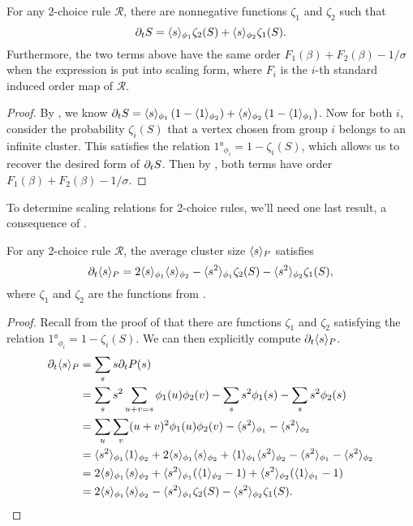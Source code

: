 \documentclass[twoside,10pt]{article}
\begin{document}
\begin{thrm}
	\label{2c-same-order}
	For any 2-choice rule $\mathcal{R}$, there are nonnegative functions $\zeta_1$ and $\zeta_2$ such that
	\[
		\partial_{t}{S} = \langle s \rangle_{\phi_1}\zeta_2(S) + \langle s \rangle_{\phi_2}\zeta_1(S).
	\] 
	Furthermore, the two terms above have the same order $F_1(\beta) + F_2(\beta) - 1/\sigma$ when the expression is put into scaling form, where $F_{i}$ is the $i$-th standard induced order map of $\mathcal{R}$.
\end{thrm}
\begin{proof}
	By , we know $\partial_{t}{S} = \langle s \rangle_{\phi_1}\left( 1-\langle 1 \rangle_{\phi_2} \right) + \langle s \rangle_{\phi_2}\left( 1-\langle 1 \rangle_{\phi_1} \right)$. Now for both $i$, consider the probability $\zeta_i(S)$ that a vertex chosen from group $i$ belongs to an infinite cluster. This satisfies the relation $\ang{1}_{\phi_i} = 1-\zeta_i(S)$, which allows us to recover the desired form of $\partial_{t}{S} $. Then by , both terms have order $F_1(\beta) + F_2(\beta) - 1/\sigma$.
\end{proof}

To determine scaling relations for 2-choice rules, we'll need one last result, a consequence of .

\begin{cor}
	\label{2c-sdel-sp}
	For any 2-choice rule $\mathcal{R}$, the average cluster size $\langle s \rangle_{P}$ satisfies
\[
        \partial_{t}{\langle s \rangle_{P}} = 2\langle s \rangle_{\phi_1}\langle s \rangle_{\phi_2} - \langle s^2 \rangle_{\phi_1}\zeta_2(S) - \langle s^2 \rangle_{\phi_2}\zeta_1(S),
\]
where $\zeta_1$ and $\zeta_2$ are the functions from .
\end{cor}
\begin{proof}
	Recall from the proof of  that there are functions $\zeta_1$ and $\zeta_2$ satisfying the relation $\ang{1}_{\phi_i} = 1-\zeta_i(S)$. We can then explicitly compute $\partial_{t}{\langle s \rangle_{P}} $.
        \begin{align*}
                \partial_{t}{\langle s \rangle_{P}} &= \sum_s s \partial_{t}{P(s)} \\
                                    &= \sum_s s^2 \sum_{u+v=s}\phi_1(u)\phi_2(v) - \sum_s s^2 \phi_1(s) - \sum_s s^2 \phi_2(s) \\
                                    &= \sum_{u}\sum_{v} (u+v)^2\phi_1(u) \phi_2(v) - \langle s^2 \rangle_{\phi_1}-\langle s^2 \rangle_{\phi_2} \\
                                    &= \langle s^2 \rangle_{\phi_1}\langle 1 \rangle_{\phi_2} + 2\langle s \rangle_{\phi_1}\langle s \rangle_{\phi_2} + \langle 1 \rangle_{\phi_1}\langle s^2 \rangle_{\phi_2}- \langle s^2 \rangle_{\phi_1}-\langle s^2 \rangle_{\phi_2} \\
                                    &= 2\langle s \rangle_{\phi_1}\langle s \rangle_{\phi_2} + \langle s^2 \rangle_{\phi_1}(\langle 1 \rangle_{\phi_2} - 1) + \langle s^2 \rangle_{\phi_2}(\langle 1 \rangle_{\phi_1}-1) \\
                                    &= 2\langle s \rangle_{\phi_1}\langle s \rangle_{\phi_2} - \langle s^2 \rangle_{\phi_1}\zeta_2(S) - \langle s^2 \rangle_{\phi_2}\zeta_1(S).
        \end{align*}
\end{proof}
\end{document}
